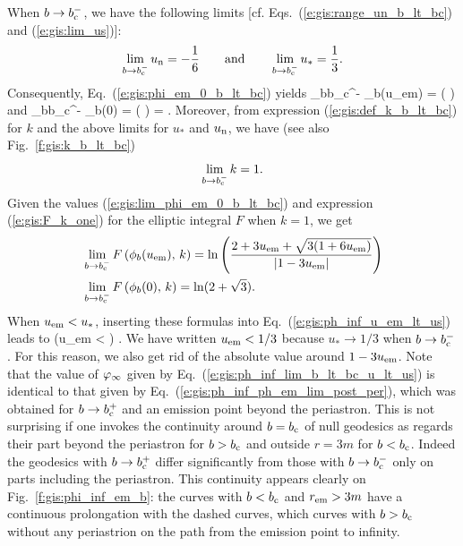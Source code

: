 When $b \to b_{\rm c}^-$, we have the following limits
[cf. Eqs.~(\ref{e:gis:range_un_b_lt_bc}) and (\ref{e:gis:lim_us})]:
\[
 \lim_{b\to b_{\rm c}^-} u_{\rm n} = - \frac{1}{6}
 \qquad\mbox{and}\qquad
 \lim_{b\to b_{\rm c}^-} u_* = \frac{1}{3} .
\]
Consequently, Eq.~(\ref{e:gis:phi_em_0_b_lt_bc}) yields
\be \label{e:gis:lim_phi_em_0_b_lt_bc}
   \lim_{b\to b_{\rm c}^-} \phi_b(u_{\rm em}) =
    \arccos\left(  \right)
   \quad\mbox{and}\quad
   \lim_{b\to b_{\rm c}^-} \phi_b(0) = \arccos\left(  \right) = .
\ee
Moreover, from expression (\ref{e:gis:def_k_b_lt_bc}) for $k$ and the above
limits for $u_*$ and $u_{\rm n}$, we have (see also Fig.~\ref{f:gis:k_b_lt_bc})
\[
    \lim_{b\to b_{\rm c}^-} k = 1 .
\]
Given the values (\ref{e:gis:lim_phi_em_0_b_lt_bc}) and expression
(\ref{e:gis:F_k_one}) for the elliptic integral $F$ when $k=1$, we get
\begin{subequations}
\label{e:gis:lim_F_em_0_b_lt_bc}
\begin{align}
    & \lim_{b\to b_{\rm c}^-} F \left( \phi_b(u_{\rm em}),\, k \right)  =
    \ln \left(
      \frac{2 + 3 u_{\rm em} + \sqrt{3(1+6 u_{\rm em})}}{|1 - 3 u_{\rm em}|}
      \right) \\
    & \lim_{b\to b_{\rm c}^-} F \left( \phi_b(0),\, k \right)  = \ln(2 + \sqrt{3}) .
\end{align}
\end{subequations}
When $u_{\rm em} < u_*$, inserting these formulas into
Eq.~(\ref{e:gis:ph_inf_u_em_lt_us}) leads to
\be \label{e:gis:ph_inf_lim_b_lt_bc_u_lt_us}
    \qquad \left(u_{\rm em} <  \right) .
\ee
We have written $u_{\rm em} < 1/3$ because $u_*\to 1/3$ when
$b\to b_{\rm c}^-$. For this reason, we also get rid of the absolute value
around $1 - 3  u_{\rm em}$.
Note that the value of $\varphi_\infty$ given by Eq.~(\ref{e:gis:ph_inf_lim_b_lt_bc_u_lt_us})
is identical to that given by Eq.~(\ref{e:gis:ph_inf_ph_em_lim_post_per}),
which was obtained for $b\to b_{\rm c}^+$ and an emission point beyond the
periastron. This is not surprising if one invokes the continuity around $b=b_{\rm c}$ of
null geodesics as regards their part beyond the periastron for $b > b_{\rm c}$
and outside $r = 3 m$ for $b < b_{\rm c}$. Indeed the geodesics with $b \to b_{\rm c}^+$
differ significantly from those with $b \to b_{\rm c}^-$ only on
parts including the periastron. This continuity appears clearly on Fig.~\ref{f:gis:phi_inf_em_b}:
the curves with $b<b_{\rm c}$ and $r_{\rm em} > 3 m$ have a continuous prolongation
with the dashed curves, which curves with $b>b_{\rm c}$ without any periastrion
on the path from the emission point to infinity.

